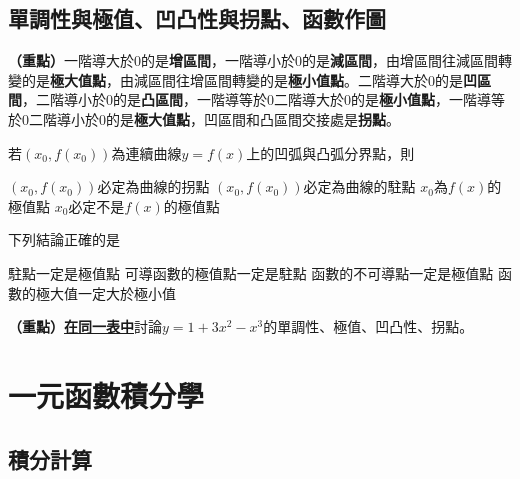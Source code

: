 \documentclass[12pt, addpoints]{exam}
\def \important{\textbf{（重點）}}
\begin{document}
\newpage %

\subsection{單調性與極值、凹凸性與拐點、函數作圖}

\begin{questions}

\question 
\important 一階導大於0的是\textbf{增區間}，一階導小於0的是\textbf{減區間}，由增區間往減區間轉變的是\textbf{極大值點}，由減區間往增區間轉變的是\textbf{極小值點}。二階導大於0的是\textbf{凹區間}，二階導小於0的是\textbf{凸區間}，一階導等於0二階導大於0的是\textbf{極小值點}，一階導等於0二階導小於0的是\textbf{極大值點}，凹區間和凸區間交接處是\textbf{拐點}。

\question[1]
若$(x_0, f(x_0))$為連續曲線$y=f(x)$上的凹弧與凸弧分界點，則
\begin{choices}
    \choice $(x_0, f(x_0))$必定為曲線的拐點
    \choice $(x_0, f(x_0))$必定為曲線的駐點
    \choice $x_0$為$f(x)$的極值點
    \choice $x_0$必定不是$f(x)$的極值點
\end{choices}

\question[1]
下列結論正確的是
\begin{choices}
    \choice 駐點一定是極值點
    \choice 可導函數的極值點一定是駐點
    \choice 函數的不可導點一定是極值點
    \choice 函數的極大值一定大於極小值
\end{choices}

\newpage %

\question[1]
\important \textbf{\underline{在同一表中}}討論$y=1+3x^2-x^3$的單調性、極值、凹凸性、拐點。

\end{questions}

\newpage %

\section{一元函數積分學}

\subsection{積分計算}
\end{document}
